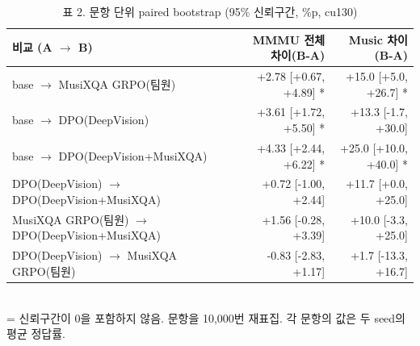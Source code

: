 \begin{table}[t]
\centering
\small
\caption{표 2. 문항 단위 paired bootstrap (95\% 신뢰구간, \%p, cu130)}
\label{tab:table2_paired_cu130}
\begin{tabular}{lrr}
\toprule
비교 (A $\to$ B) & MMMU 전체 차이(B-A) & Music 차이(B-A) \\
\midrule
base $\to$ MusiXQA GRPO(팀원) & +2.78 [+0.67, +4.89] * & +15.0 [+5.0, +26.7] * \\
base $\to$ DPO(DeepVision) & +3.61 [+1.72, +5.50] * & +13.3 [-1.7, +30.0] \\
base $\to$ DPO(DeepVision+MusiXQA) & +4.33 [+2.44, +6.22] * & +25.0 [+10.0, +40.0] * \\
DPO(DeepVision) $\to$ DPO(DeepVision+MusiXQA) & +0.72 [-1.00, +2.44] & +11.7 [+0.0, +25.0] \\
MusiXQA GRPO(팀원) $\to$ DPO(DeepVision+MusiXQA) & +1.56 [-0.28, +3.39] & +10.0 [-3.3, +25.0] \\
DPO(DeepVision) $\to$ MusiXQA GRPO(팀원) & -0.83 [-2.83, +1.17] & +1.7 [-13.3, +16.7] \\
\bottomrule
\end{tabular}
\\[2pt]{\footnotesize * = 신뢰구간이 0을 포함하지 않음. 문항을 10,000번 재표집. 각 문항의 값은 두 seed의 평균 정답률.}
\end{table}

